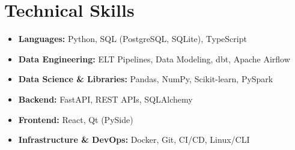 
\section{Technical Skills}
\begin{itemize}[leftmargin=0in, label={}, itemsep=2pt]
    \item \textbf{Languages:} Python, SQL (PostgreSQL, SQLite), TypeScript
    \item \textbf{Data Engineering:} ELT Pipelines, Data Modeling, dbt, Apache Airflow
    \item \textbf{Data Science \& Libraries:} Pandas, NumPy, Scikit-learn, PySpark
    \item \textbf{Backend:} FastAPI, REST APIs, SQLAlchemy
    \item \textbf{Frontend:} React, Qt (PySide)
    \item \textbf{Infrastructure \& DevOps:} Docker, Git, CI/CD, Linux/CLI
\end{itemize}
